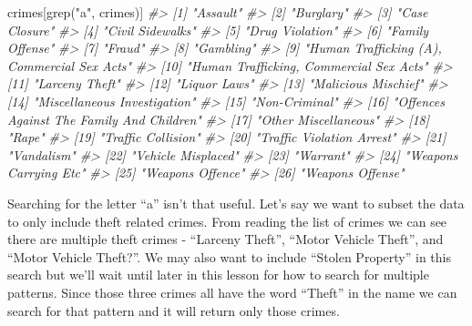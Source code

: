 \documentclass[
]{krantz}
\makeatletter
\newenvironment{Shaded}{\begin{snugshade}}{\end{snugshade}}
\newcommand{\CommentTok}[1]{\textcolor[rgb]{0.37,0.37,0.37}{\textit{#1}}}
\newcommand{\FunctionTok}[1]{\textcolor[rgb]{0,0,0}{#1}}
\newcommand{\NormalTok}[1]{#1}
\newcommand{\StringTok}[1]{\textcolor[rgb]{0.5,0.5,0.5}{#1}}
\newenvironment{kframe}{%
\medskip{}
\setlength{\fboxsep}{.8em}
 \def\at@end@of@kframe{}%
 \ifinner\ifhmode%
  \def\at@end@of@kframe{\end{minipage}}%
  \begin{minipage}{\columnwidth}%
 \fi\fi%
 \def\FrameCommand##1{\hskip\@totalleftmargin \hskip-\fboxsep
 \colorbox{shadecolor}{##1}\hskip-\fboxsep
     \hskip-\linewidth \hskip-\@totalleftmargin \hskip\columnwidth}%
 \MakeFramed {\advance\hsize-\width
   \@totalleftmargin\z@ \linewidth\hsize
   \@setminipage}}%
 {\par\unskip\endMakeFramed%
 \at@end@of@kframe}
\renewenvironment{Shaded}{\begin{kframe}}{\end{kframe}}
\makeatother
\begin{document}
\begin{Shaded}
\begin{Highlighting}[]
\NormalTok{crimes[}\FunctionTok{grep}\NormalTok{(}\StringTok{"a"}\NormalTok{, crimes)]}
\CommentTok{\#\textgreater{}  [1] "Assault"                                   }
\CommentTok{\#\textgreater{}  [2] "Burglary"                                  }
\CommentTok{\#\textgreater{}  [3] "Case Closure"                              }
\CommentTok{\#\textgreater{}  [4] "Civil Sidewalks"                           }
\CommentTok{\#\textgreater{}  [5] "Drug Violation"                            }
\CommentTok{\#\textgreater{}  [6] "Family Offense"                            }
\CommentTok{\#\textgreater{}  [7] "Fraud"                                     }
\CommentTok{\#\textgreater{}  [8] "Gambling"                                  }
\CommentTok{\#\textgreater{}  [9] "Human Trafficking (A), Commercial Sex Acts"}
\CommentTok{\#\textgreater{} [10] "Human Trafficking, Commercial Sex Acts"    }
\CommentTok{\#\textgreater{} [11] "Larceny Theft"                             }
\CommentTok{\#\textgreater{} [12] "Liquor Laws"                               }
\CommentTok{\#\textgreater{} [13] "Malicious Mischief"                        }
\CommentTok{\#\textgreater{} [14] "Miscellaneous Investigation"               }
\CommentTok{\#\textgreater{} [15] "Non{-}Criminal"                              }
\CommentTok{\#\textgreater{} [16] "Offences Against The Family And Children"  }
\CommentTok{\#\textgreater{} [17] "Other Miscellaneous"                       }
\CommentTok{\#\textgreater{} [18] "Rape"                                      }
\CommentTok{\#\textgreater{} [19] "Traffic Collision"                         }
\CommentTok{\#\textgreater{} [20] "Traffic Violation Arrest"                  }
\CommentTok{\#\textgreater{} [21] "Vandalism"                                 }
\CommentTok{\#\textgreater{} [22] "Vehicle Misplaced"                         }
\CommentTok{\#\textgreater{} [23] "Warrant"                                   }
\CommentTok{\#\textgreater{} [24] "Weapons Carrying Etc"                      }
\CommentTok{\#\textgreater{} [25] "Weapons Offence"                           }
\CommentTok{\#\textgreater{} [26] "Weapons Offense"}
\end{Highlighting}
\end{Shaded}

Searching for the letter ``a'' isn't that useful. Let's say
we want to subset the data to only include theft related
crimes. From reading the list of crimes we can see there are
multiple theft crimes - ``Larceny Theft'', ``Motor Vehicle
Theft'', and ``Motor Vehicle Theft?''. We may also want to
include ``Stolen Property'' in this search but we'll wait
until later in this lesson for how to search for multiple
patterns. Since those three crimes all have the word
``Theft'' in the name we can search for that pattern and it
will return only those crimes.
\end{document}
